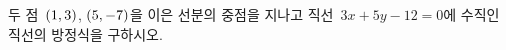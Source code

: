 두 점~$(1{,}\mkern3mu\mathopen{}3)$, $(5{,}\mkern3mu\mathopen{}-7)$을 이은 선분의 중점을 지나고 직선~$3x+5y-12=0$에 수직인 직선의 방정식을 구하시오.
